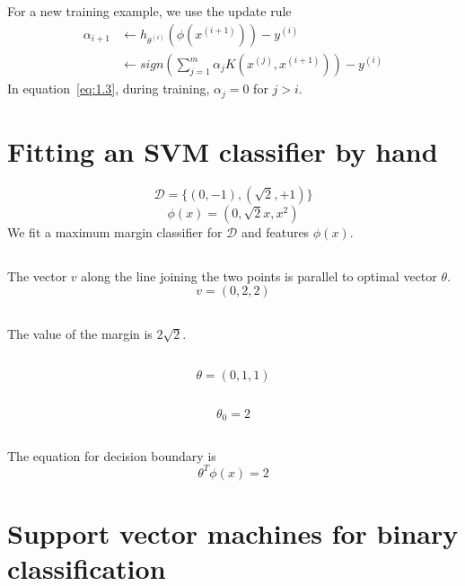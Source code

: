 \documentclass{article}
\begin{document}
\subsection{}
For a new training example, we use the update rule
\begin{equation}
  \label{eq:1.3}
  \begin{split}
   \alpha_{i+1} &\leftarrow h_{\theta^{(i)}}(\phi(x^{(i+1)})) - y^{(i)} \\
   			&\leftarrow sign\left(\sum_{j=1}^{m} \alpha_j K( x^{(j)}, x^{(i+1)} )\right) - y^{(i)}
  \end{split}
\end{equation}
In equation~\ref{eq:1.3}, during training, $\alpha_j = 0$ for $j > i$.


\section{Fitting an SVM classifier by hand}
\begin{equation*}
	\mathcal{D} = \{ (0,-1) , (\sqrt{2},+1) \} 
\end{equation*}
\begin{equation*}
	\phi(x) = (0,\sqrt{2}x,x^2) 
\end{equation*}
We fit a maximum margin classifier for $\mathcal{D}$ and features $\phi(x)$.

\subsection{}
The vector $v$ along the line joining the two points is parallel to optimal vector $\theta$.
\begin{equation*}
	v = (0,2,2)
\end{equation*}

\subsection{}
The value of the margin is $2\sqrt{2}$.

\subsection{}
\begin{equation*}
	\theta = (0,1,1)
\end{equation*}

\subsection{}
\begin{equation*}
	\theta_0 = 2
\end{equation*}

\subsection{}
The equation for decision boundary is
\begin{equation*}
	\theta^T \phi(x) = 2
\end{equation*}

\section{Support vector machines for binary classification}
\end{document}
